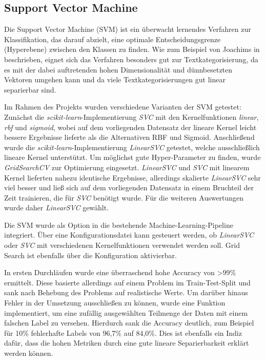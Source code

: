 \subsection{Support Vector Machine}
\label{SVM}

Die Support Vector Machine (SVM) ist ein überwacht lernendes Verfahren zur Klassifikation, das darauf abzielt, eine optimale Entscheidungsgrenze (Hyperebene) zwischen den Klassen zu finden. Wie zum Beispiel von Joachims in \cite{textCategorizationWithSVM} beschrieben, eignet sich das Verfahren besonders gut zur Textkategorisierung, da es mit der dabei auftretenden hohen Dimensionalität und dünnbesetzten Vektoren umgehen kann und da viele Textkategorisierungen gut linear separierbar sind.

Im Rahmen des Projekts wurden verschiedene Varianten der SVM getestet: Zunächst die \textit{scikit-learn}-Implementierung \textit{SVC} mit den Kernelfunktionen \textit{linear}, \textit{rbf} und \textit{sigmoid}, wobei auf dem vorliegenden Datensatz der lineare Kernel leicht bessere Ergebnisse lieferte als die Alternativen RBF und Sigmoid. Anschließend wurde die \textit{scikit-learn}-Implementierung \textit{LinearSVC} getestet, welche ausschließlich lineare Kernel unterstützt.  Um möglichst gute Hyper-Parameter zu finden, wurde \textit{GridSearchCV} zur Optimierung eingesetzt. \textit{LinearSVC} und \textit{SVC} mit linearem Kernel lieferten nahezu identische Ergebnisse, allerdings skalierte \textit{LinearSVC} sehr viel besser und ließ sich auf dem vorliegenden Datensatz in einem Bruchteil der Zeit trainieren, die für \textit{SVC} benötigt wurde. Für die weiteren Auswertungen wurde daher \textit{LinearSVC} gewählt.

Die SVM wurde als Option in die bestehende Machine-Learning-Pipeline integriert. Über eine Konfigurationsdatei kann gesteuert werden, ob \textit{LinearSVC} oder \textit{SVC} mit verschiedenen Kernelfunktionen verwendet werden soll. Grid Search ist ebenfalls über die Konfiguration aktivierbar.

In ersten Durchläufen wurde eine überraschend hohe Accuracy von >99\% ermittelt. Diese basierte allerdings auf einem Problem im Train-Test-Split und sank nach Behebung des Problems auf realistische Werte. Um darüber hinaus Fehler in der Umsetzung ausschließen zu können, wurde eine Funktion implementiert, um eine zufällig ausgewählten Teilmenge der Daten mit einem falschen Label zu versehen. Hierdurch sank die Accuracy deutlich, zum Beispiel für 10\% fehlerhafte Labels von 96,7\% auf 84,0\%. Dies ist ebenfalls ein Indiz dafür, dass die hohen Metriken durch eine gute lineare Separierbarkeit erklärt werden können.
